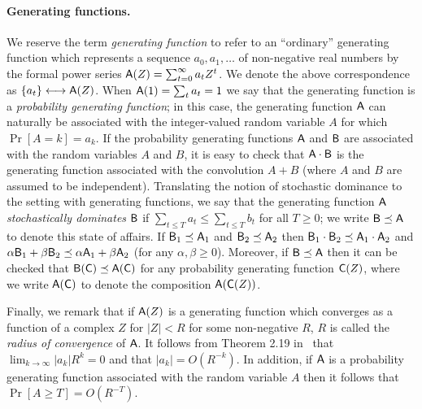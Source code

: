   \paragraph{Generating functions.}
    We reserve the term
    \emph{generating function} to refer to an ``ordinary'' generating
    function which represents a sequence $a_0, a_1, \ldots$ of
    non-negative real numbers by the formal power series
    $\mathsf{A}(Z) = \sum_{t = 0}^\infty a_t Z^t$. 
    We denote the above correspondence as $\{a_t\} \longleftrightarrow \mathsf{A}(Z)$. 
    When
    $\mathsf{A}(1) = \sum_t a_t = 1$ we say that the generating function is
    a \emph{probability generating function}; in this case, the
    generating function $\mathsf{A}$ can naturally be associated with the
    integer-valued random variable $A$ for which $\Pr[A = k] = a_k$. If
    the probability generating functions $\mathsf{A}$ and $\mathsf{B}$ are
    associated with the random variables $A$ and $B$, it is easy to
    check that $\mathsf{A} \cdot \mathsf{B}$ is the generating function
    associated with the convolution $A + B$ (where $A$ and $B$ are
    assumed to be independent).  Translating the notion of stochastic
    dominance to the setting with generating functions, we say that the
    generating function $\mathsf{A}$ \emph{stochastically dominates}
    $\mathsf{B}$ if $\sum_{t \leq T} a_t \leq \sum_{t \leq T} b_t$ for all
    $T \geq 0$; we write $\mathsf{B} \preceq \mathsf{A}$ to denote this state of
    affairs. If $\mathsf{B}_1 \preceq \mathsf{A}_1$ and
    $\mathsf{B}_2 \preceq \mathsf{A}_2$ then
    $\mathsf{B}_1 \cdot \mathsf{B}_2 \preceq \mathsf{A}_1 \cdot \mathsf{A}_2$ and
    $\alpha \mathsf{B}_1 + \beta \mathsf{B}_2 \preceq \alpha \mathsf{A}_1 + \beta
    \mathsf{A}_2$ (for any $\alpha, \beta \geq 0$).  Moreover, if
    $\mathsf{B} \preceq \mathsf{A}$ then it can be checked that
    $\mathsf{B}(\mathsf{C}) \preceq \mathsf{A}(\mathsf{C})$ for any probability
    generating function $\mathsf{C}(Z)$, where we write $\mathsf{A}(\mathsf{C})$ to
    denote the composition $\mathsf{A}(\mathsf{C}(Z))$.


    Finally, we remark that
    if $\mathsf{A}(Z)$ is a generating function which converges as a
    function of a complex $Z$ for $|Z| < R$ for some non-negative $R$, 
    $R$ is called the \emph{radius of convergence} of $\mathsf{A}$.  
    It follows from Theorem 2.19 in~\cite{WilfGF} that 
    $\lim_{k \rightarrow \infty} {|a_k|}R^k = 0$ and that $|a_k| = O(R^{-k})$. 
    In addition, if $\mathsf{A}$ is a probability generating function associated with the
    random variable $A$ then it follows that
    $\Pr[A \geq T] = O(R^{-T})$. 



